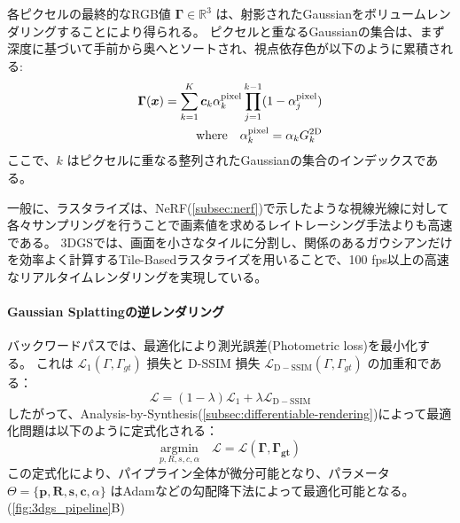 各ピクセルの最終的なRGB値 $\bm{\Gamma} \in \mathbb{R}^{3}$ は、射影されたGaussianをボリュームレンダリングすることにより得られる。
ピクセルと重なるGaussianの集合は、まず深度に基づいて手前から奥へとソートされ、視点依存色が以下のように累積される:
\begin{align}\label{eq:3dgs-alpha-blending}
  \bm{\Gamma}(\bm{x}) = \sum_{k=1}^{K} \bm{c}_k \alpha^{\text{pixel}}_k \prod_{j=1}^{k-1} (1-\alpha^{\text{pixel}}_j) \\
  \quad \text{where} \quad \alpha^{\text{pixel}}_k = \alpha_k G_k^{\mathrm{2D}} \notag
\end{align}
ここで、$k$ はピクセルに重なる整列されたGaussianの集合のインデックスである。

一般に、ラスタライズは、NeRF(\cref{subsec:nerf})で示したような視線光線に対して各々サンプリングを行うことで画素値を求めるレイトレーシング手法よりも高速である。
3DGSでは、画面を小さなタイルに分割し、関係のあるガウシアンだけを効率よく計算するTile-Basedラスタライズを用いることで、100 fps以上の高速なリアルタイムレンダリングを実現している。


\paragraph{Gaussian Splattingの逆レンダリング}
バックワードパスでは、最適化により測光誤差(Photometric loss)を最小化する。
これは $\mathcal{L}_1 (\Gamma, \Gamma_{gt})$ 損失と D-SSIM 損失 $\mathcal{L}_\mathrm{D-SSIM} (\Gamma, \Gamma_{gt})$ \parencite{Zhou2004_SSIM} の加重和である：
\begin{equation}\label{eq:loss-function}
  \mathcal{L} = (1 - \lambda) \mathcal{L}_1 + \lambda \mathcal{L}_\mathrm{D-SSIM}
\end{equation}
したがって、Analysis-by-Synthesis(\cref{subsec:differentiable-rendering})によって最適化問題は以下のように定式化される：
\begin{equation}\label{eq:optimization}
  \underset{p, R, s, c, \alpha}{\textrm{argmin}} \quad \mathcal{L} = \mathcal{L}(\bm{\Gamma}, \bm{\Gamma_{gt}}) 
\end{equation}
この定式化により、パイプライン全体が微分可能となり、パラメータ $\Theta = \{\bm{p}, \bm{R}, \bm{s}, \bm{c}, \alpha\}$ はAdamなどの勾配降下法\parencite{Adam}によって最適化可能となる。
(\cref{fig:3dgs_pipeline}B)

